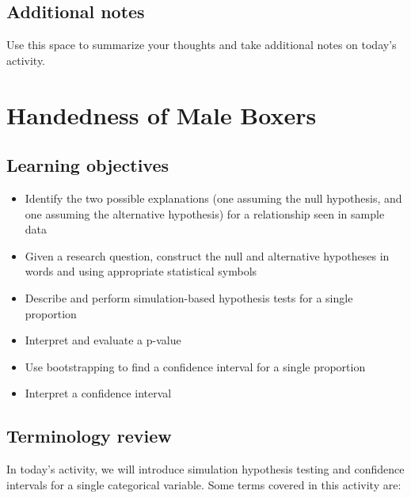 \documentclass[
]{report}
\begin{document}
\vspace{1in}

\newpage

\hypertarget{additional-notes}{%
\section{Additional notes}\label{additional-notes}}

Use this space to summarize your thoughts and take additional notes on today's activity.

\hypertarget{handedness-of-male-boxers}{%
\chapter{Handedness of Male Boxers}\label{handedness-of-male-boxers}}

\hypertarget{learning-objectives}{%
\section{Learning objectives}\label{learning-objectives}}

\begin{itemize}
\item
  Identify the two possible explanations (one assuming the null hypothesis, and one assuming the alternative hypothesis) for a relationship seen in sample data
\item
  Given a research question, construct the null and alternative hypotheses
  in words and using appropriate statistical symbols
\item
  Describe and perform simulation-based hypothesis tests for a single proportion
\item
  Interpret and evaluate a p-value
\item
  Use bootstrapping to find a confidence interval for a single proportion
\item
  Interpret a confidence interval
\end{itemize}

\hypertarget{terminology-review}{%
\section{Terminology review}\label{terminology-review}}

In today's activity, we will introduce simulation hypothesis testing and confidence intervals for a single categorical variable. Some terms covered in this activity are:
\end{document}
